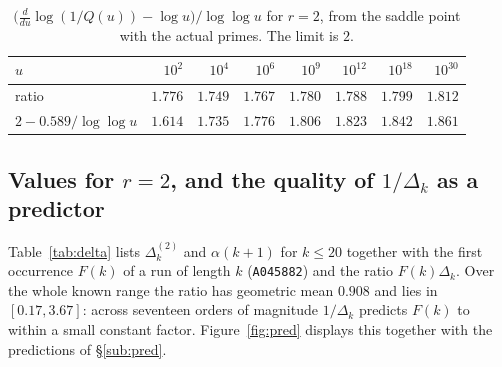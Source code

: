\documentclass[11pt,reqno]{amsart}
\theoremstyle{plain}
\theoremstyle{definition}
\numberwithin{equation}{section}
\begin{document}
\begin{table}[ht]
\caption{$\bigl(\frac{d}{du}\log(1/Q(u))-\log u\bigr)/\log\log u$ for $r=2$, from the
saddle point with the actual primes. The limit is $2$.}
\label{tab:extrap}
\begin{tabular}{lrrrrrrr}
\toprule
$u$ & $10^{2}$ & $10^{4}$ & $10^{6}$ & $10^{9}$ & $10^{12}$ & $10^{18}$ & $10^{30}$\\
\midrule
ratio & $1.776$ & $1.749$ & $1.767$ & $1.780$ & $1.788$ & $1.799$ & $1.812$\\
$2-0.589/\log\log u$ & $1.614$ & $1.735$ & $1.776$ & $1.806$ & $1.823$ & $1.842$ & $1.861$\\
\bottomrule
\end{tabular}
\end{table}

\subsection{Values for $r=2$, and the quality of $1/\Delta_k$ as a predictor}
Table~\ref{tab:delta} lists $\Delta^{(2)}_k$ and $\alpha(k+1)$ for $k\le20$ together with
the first occurrence $F(k)$ of a run of length $k$ (\texttt{A045882}) and the ratio
$F(k)\Delta_k$. Over the whole known range the ratio has geometric mean $0.908$ and lies in
$[0.17,3.67]$: across seventeen orders of magnitude $1/\Delta_k$ predicts $F(k)$ to within
a small constant factor. Figure~\ref{fig:pred} displays this together with the predictions
of \S\ref{sub:pred}.
\end{document}
